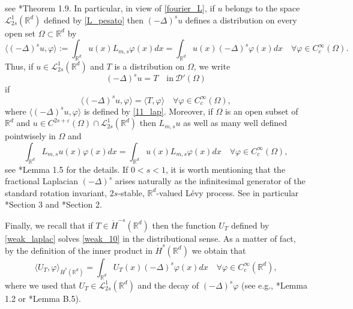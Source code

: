 \documentclass[letterpaper, 11pt,  reqno]{amsart}
\theoremstyle{definition}
\theoremstyle{remark}
\numberwithin{equation}{section}
\newcommand{\bbr}{\mathbb{R}}
\newcommand{\ve}{\varepsilon}
\newcommand{\R}{{\mathbb R}}
\begin{document}
	see \cite{Abatangelo_2}*{Theorem 1.9}.
	In particular, in view of \eqref{fourier_L},  if $u$ belongs to the space $\mathscr{L}^{1}_{2s}(\bbr^d)$ defined by \eqref{L_pesato}
	then $(-\Delta)^{s}u$ defines a distribution on every open set $\Omega\subset \R^d$ by 
	\begin{equation}\label{11_lap}
		\langle (-\Delta)^{s}u, \varphi \rangle :=\int_{\R^d}u(x)L_{m,s}\varphi(x) dx=\int_{\R^d}u(x)(-\Delta)^s\varphi(x)dx\quad \forall \varphi\in C^{\infty}_c(\Omega).
	\end{equation}
Thus, if $u\in \mathscr{L}^1_{2s}(\R^d)$ and $T$ is a distribution on $\Omega$, we write 
$$(-\Delta)^{s}u=T\quad \text{in}\ \mathscr{D}'(\Omega)$$
if 
$$\langle (-\Delta)^{s}u, \varphi \rangle= \langle T,\varphi\rangle\quad \forall \varphi\in C^{\infty}_{c}(\Omega),$$
where $\langle (-\Delta)^{s}u, \varphi \rangle$ is defined by \eqref{11_lap}.
	Moreover,   if $\Omega$ is an open subset of $\R^d$ and $u\in C^{2s+\ve}(\Omega)\cap \mathscr{L}^1_{2s}(\R^d)$ then $L_{m,s} u$ as well as many  well defined pointwisely in $\Omega$ and 
	\begin{equation*}
		\int_{\R^d} L_{m,s}u(x)\varphi(x)dx=\int_{\R^d}u(x)L_{m,s}\varphi(x)dx\quad \forall \varphi\in C^{\infty}_c(\Omega),
	\end{equation*}
see \cite{Abatangelo_2}*{Lemma 1.5} for the details.
If $0<s<1$, it is worth mentioning that the fractional Laplacian $(-\Delta)^s$  arises naturally as the infinitesimal generator of the standard rotation invariant,  $2s$-stable, $\R^d$-valued L\'evy process. See in particular \cite{BBK}*{Section 3} and \cite{BBK2}*{Section 2}.

 Finally, we recall that if $T\in \dot{H}^{-s}(\R^d)$ then the function $U_T$ defined by \eqref{weak_laplac} solves \eqref{weak_10} in the distributional sense. As a matter of fact, by the definition of the inner product in $\dot{H}^s(\R^d)$ we obtain that
	\begin{equation}\label{weak_distr}
		\langle {U}_T, \varphi \rangle_{\dot{H}^{s}(\bbr^d)}\!=\!\int_{\R^d}U_T(x)(-\Delta)^s \varphi(x)dx\quad \forall \varphi\in C^{\infty}_c(\R^d),
	\end{equation}
	where we used that $U_T\in \mathscr{L}^1_{2s}(\R^d)$ and the decay of $(-\Delta)^s\varphi$ (see e.g.,  \cite{mazya}*{Lemma 1.2} or \cite{Abatangelo_1}*{Lemma B.5}).
\end{document}
